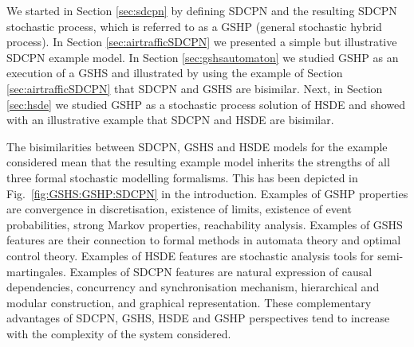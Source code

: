 \documentclass[copyright,creativecommons]{eptcs}
\begin{document}
We started in Section \ref{sec:sdcpn} by defining SDCPN and the
resulting SDCPN stochastic process, which is referred to as a GSHP
(general stochastic hybrid process). In Section
\ref{sec:airtrafficSDCPN} we presented a simple but illustrative
SDCPN example model. In Section \ref{sec:gshsautomaton} we studied
GSHP as an execution of a GSHS and illustrated by using the
example of Section \ref{sec:airtrafficSDCPN} that SDCPN and GSHS
are bisimilar. Next, in Section \ref{sec:hsde} we studied GSHP as
a stochastic process solution of HSDE and showed with an
illustrative example that SDCPN and HSDE are bisimilar.

The bisimilarities between SDCPN, GSHS and HSDE models for the
example considered mean that the resulting example model inherits
the strengths of all three formal stochastic modelling formalisms.
This has been depicted in Fig.\ \ref{fig:GSHS:GSHP:SDCPN} in the
introduction. Examples of GSHP properties are convergence in
discretisation, existence of limits, existence of event
probabilities, strong Markov properties, reachability analysis.
Examples of GSHS features are their connection to formal methods
in automata theory and optimal control theory. Examples of HSDE
features are stochastic analysis tools for semi-martingales.
Examples of SDCPN features are natural expression of causal
dependencies, concurrency and synchronisation mechanism,
hierarchical and modular construction, and graphical
representation. These complementary advantages of SDCPN, GSHS,
HSDE and GSHP perspectives tend to increase with the complexity of
the system considered.
\end{document}
